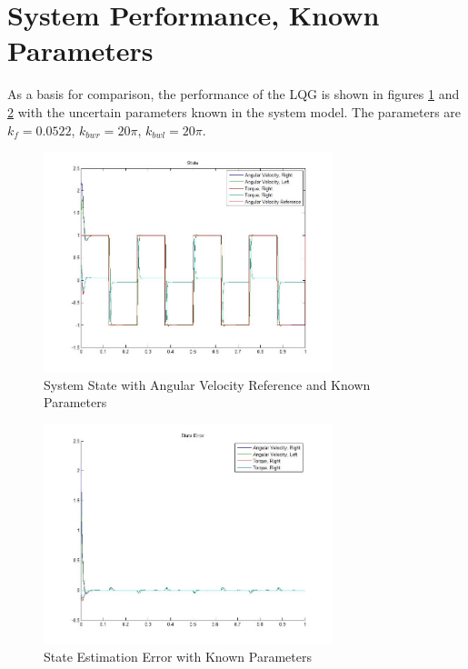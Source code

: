\documentclass[letterpaper,12pt]{report}
\begin{document}
\section{System Performance, Known Parameters}
As a basis for comparison, the performance of the LQG is shown in figures \ref{fig:ssKpDiagram1} and \ref{fig:seKpDiagram1} with the uncertain parameters known in the system model.
The parameters are $k_f = 0.0522$, $k_{bwr} = 20\pi$, $k_{bwl} = 20\pi$.
\begin{figure}[h]
	\centering
	\includegraphics[width=0.75\textwidth]{Certain_State1.jpg}
	\caption{System State with Angular Velocity Reference and Known Parameters}
	\label{fig:ssKpDiagram1}
\end{figure}
\begin{figure}[h]
	\centering
	\includegraphics[width=0.75\textwidth]{Certain_StateError1.jpg}
	\caption{State Estimation Error with Known Parameters}
	\label{fig:seKpDiagram1}
\end{figure}
\end{document}
